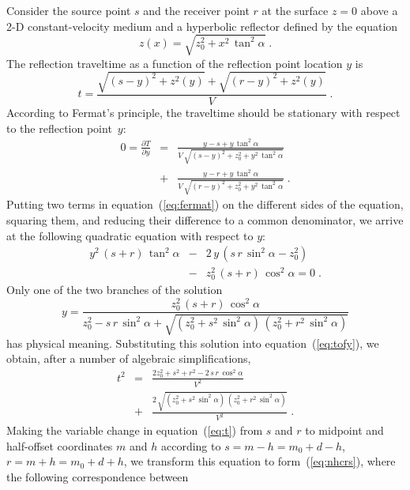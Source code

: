 Consider the source point $s$ and the receiver point $r$ at the
surface $z=0$ above a 2-D constant-velocity medium and a hyperbolic
reflector defined by the equation 
\begin{equation}
  \label{eq:hypref}
  z(x) = \sqrt{z_0^2 +
    x^2\,\tan^2{\alpha}}\;.
\end{equation}
The reflection traveltime as a function of the reflection point
location $y$ is
\begin{equation}
  \label{eq:tofy}
  t = \frac{\sqrt{(s-y)^2 + z^2(y)} + \sqrt{(r-y)^2+z^2(y)}}{V}\;.
\end{equation}
According to Fermat's principle, the traveltime should be stationary
with respect to the reflection point~$y$:
\begin{eqnarray}
\nonumber
0 = \frac{\partial T}{\partial y} & = &
\frac{y-s + y\,\tan^2{\alpha}}{V\,\sqrt{(s-y)^2 + z_0^2 + y^2\,\tan^2{\alpha}}} \\
& + &
\frac{y-r + y\,\tan^2{\alpha}}{V\,\sqrt{(r-y)^2 + z_0^2 + y^2\,\tan^2{\alpha}}}\;.
\label{eq:fermat}
\end{eqnarray}
Putting two terms in equation~(\ref{eq:fermat}) on the different sides
of the equation, squaring them, and reducing their difference to a
common denominator, we arrive at the following quadratic equation with
respect to $y$:
\begin{eqnarray}
\nonumber
  y^2\,(s+r)\,\tan^2{\alpha} & - & 2\,y\,\left(s\,r\,\sin^2{\alpha} - z_0^2\right) \\
  & - & z_0^2\,(s+r)\,\cos^2{\alpha} = 0\;.
  \label{eq:y2}
\end{eqnarray}
Only one of the two branches of the solution
\[
  y =
  \frac{z_0^2\,(s+r)\,\cos^2{\alpha}}{z_0^2 - s\,r\,\sin^2{\alpha} +
    \sqrt{(z_0^2+s^2\,\sin^2{\alpha})\,(z_0^2+r^2\,\sin^2{\alpha})}}
  \label{eq:ys}
\]
has physical meaning. Substituting this solution into
equation~(\ref{eq:tofy}), we obtain, after a number of algebraic
simplifications,
\begin{eqnarray}
\nonumber
  t^2 & = & \frac{2 z_0^2 + s^2 + r^2 - 2\,s\,r\,\cos^2{\alpha}}{V^2} \\
  & + &	\frac{2\,\sqrt{(z_0^2+s^2\,\sin^2{\alpha})\,(z_0^2+r^2\,\sin^2{\alpha})}}{V^2}\;.
	\label{eq:t}
\end{eqnarray}
Making the variable change in equation~(\ref{eq:t}) from $s$ and $r$
to midpoint and half-offset coordinates $m$ and $h$ according to
$s=m-h=m_0+d-h$, $r=m+h=m_0+d+h $, we transform this equation to
form~(\ref{eq:nhcrs}), where the following correspondence between
